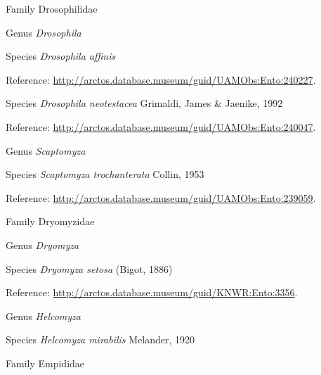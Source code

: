 \documentclass[9pt, article]{memoir}
\begin{document}
\begin{multicols}{2}
\vspace{6pt}\noindent\hspace{24pt}Family Drosophilidae


\vspace{6pt}\noindent\hspace{30pt}Genus \textit{Drosophila}


\vspace{6pt}\noindent\hspace{36pt}Species \textit{Drosophila affinis}


Reference: 
\url{http://arctos.database.museum/guid/UAMObs:Ento:240227}.

\vspace{6pt}\noindent\hspace{36pt}Species \textit{Drosophila neotestacea} Grimaldi, James \& Jaenike, 1992


Reference: 
\url{http://arctos.database.museum/guid/UAMObs:Ento:240047}.

\vspace{6pt}\noindent\hspace{30pt}Genus \textit{Scaptomyza}


\vspace{6pt}\noindent\hspace{36pt}Species \textit{Scaptomyza trochanterata} Collin, 1953


Reference: 
\url{http://arctos.database.museum/guid/UAMObs:Ento:239059}.

\vspace{6pt}\noindent\hspace{24pt}Family Dryomyzidae


\vspace{6pt}\noindent\hspace{30pt}Genus \textit{Dryomyza}


\vspace{6pt}\noindent\hspace{36pt}Species \textit{Dryomyza setosa} (Bigot, 1886)


Reference: 
\url{http://arctos.database.museum/guid/KNWR:Ento:3356}.

\vspace{6pt}\noindent\hspace{30pt}Genus \textit{Helcomyza}


\vspace{6pt}\noindent\hspace{36pt}Species \textit{Helcomyza mirabilis} Melander, 1920


\vspace{6pt}\noindent\hspace{24pt}Family Empididae



\end{multicols}
\end{document}
